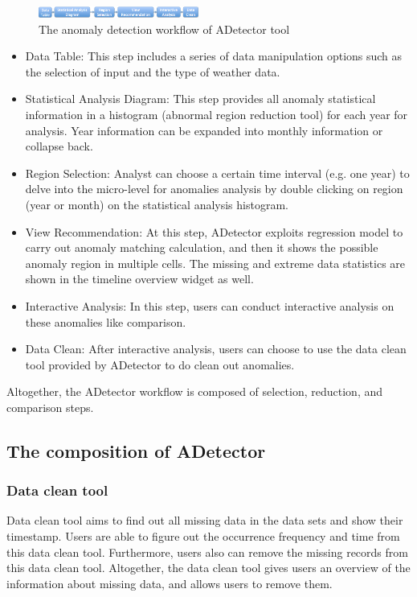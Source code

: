 \documentclass{vgtc}                          %
\begin{document}
\begin{figure}[htb]
	\centering
	\includegraphics[width=0.47\textwidth]{workflow.png}
	\caption{The anomaly detection workflow of ADetector tool}
	\label{fig:workflow}
\end{figure}

\begin{itemize}
	\item Data Table: This step includes a series of data manipulation options such as the selection of input and the type of weather data. 
	\item Statistical Analysis Diagram: This step provides all anomaly statistical information in a histogram (abnormal region reduction tool) for each year for analysis. Year information can be expanded into monthly information or collapse back.
	\item Region Selection: Analyst can choose a certain time interval (e.g. one year) to delve into the micro-level for anomalies analysis by double clicking on region (year or month) on the statistical analysis histogram.
	\item View Recommendation: At this step, ADetector exploits regression model to carry out anomaly matching calculation, and then it shows the possible anomaly region in multiple cells. The missing and extreme data statistics are shown in the timeline overview widget as well.
	\item Interactive Analysis: In this step, users can conduct interactive analysis on these anomalies like comparison.
	\item Data Clean: After interactive analysis, users can choose to use the data clean tool provided by ADetector to do clean out anomalies.
\end{itemize}
Altogether, the ADetector workflow is composed of selection, reduction, and comparison steps.

\subsection{The composition of ADetector}
\subsubsection{Data clean tool}

Data clean tool aims to find out all missing data in the data sets and show their timestamp. Users are able to figure out the occurrence frequency and time from this data clean tool. Furthermore, users also can remove the missing records from this data clean tool. Altogether, the data clean tool gives users an overview of the information about missing data, and allows users to remove them. 
\end{document}
